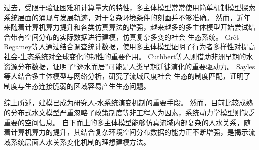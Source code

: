 过去，受限于验证困难和计算量大的特性，多主体模型常常使用简单机制模型探索系统层面的涌现与发展轨迹，对于复杂环境条件的刻画并不够准确\cite{biggs2021}。
然而，近年来随着计算机算力提升和各类仿真算法的增强，越来越多的多主体模型开始尝试结合带有空间分布的实际数据进行建模，仿真复杂多变的社会-生态系统\cite{steger2021}。
Grêt-Regamey等人通过结合调查统计数据，使用多主体模型证明了行为者多样性对提高社会-生态系统对全球变化的韧性的重要作用\cite{gret-regamey2019}。
Cuthbert等人则借助非洲早期的水资源分布数据，证明了“逐水而居”可能是人类早期迁徙演化的重要驱动力\cite{cuthbert2017}。
Sayles等人结合多主体模型与网络分析，研究了流域尺度社会-生态的制度匹配，证明了制度与生态连接脆弱的区域容易产生生态问题\cite{sayles2017}。

综上所述，建模已成为研究人-水系统演变机制的重要手段。
然而，目前比较成熟的分布式水文模型严重忽略了政策制度等非工程人为因素，系统动力学模型则缺乏重要的空间信息。
自下而上的多主体模型能够仿真流域内部复杂的人水关系，随着计算机算力的提升，其结合复杂环境空间分布数据的能力正不断增强，是揭示流域系统层面人水关系变化机制的理想建模方法。
